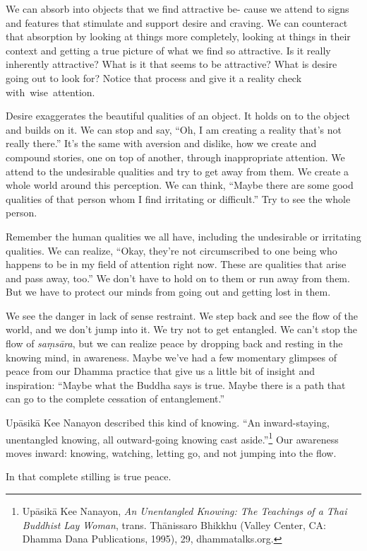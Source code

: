 We can absorb into objects that we find attractive be- \linebreak cause we attend to signs and features that stimulate and support desire and craving. We can counteract that absorption by looking at things more completely, looking at things in their context and getting a true picture of what we find so attractive. Is it really inherently attractive? What is it that seems to be attractive? What is desire going out to look for? Notice that process and give it a reality check \mbox{with wise attention.}

Desire exaggerates the beautiful qualities of an object. It holds on to the object and builds on it. We can stop and say, ``Oh, I am creating a reality that's not really there.'' It's the same with aversion and dislike, how we create and compound stories, one on top of another, through inappropriate attention. We attend to the undesirable qualities and try to get away from them. We create a whole world around this perception. We can think, ``Maybe there are some good qualities of that person whom I find irritating or difficult.'' Try to see the whole person.

Remember the human qualities we all have, including the undesirable or irritating qualities. We can realize, ``Okay, they're not circumscribed to one being who happens to be in my field of attention right now. These are qualities that arise and pass away, too.'' We don't have to hold on to them or run away from them. But we have to protect our minds from going out and getting lost in them.

We see the danger in lack of sense restraint. We step back and see the flow of the world, and we don't jump into it. We try not to get entangled. We can't stop the flow of \emph{saṃsāra}, but we can realize peace by dropping back and resting in the knowing mind, in awareness. Maybe we've had a few momentary glimpses of peace from our Dhamma practice that give us a little bit of insight and inspiration: ``Maybe what the Buddha says is true. Maybe there is a path that can go to the complete cessation of entanglement.''

Upāsikā Kee Nanayon described this kind of knowing. ``An inward-staying, unentangled knowing, all outward-going knowing cast aside.''\footnote{Upāsikā Kee Nanayon, \emph{An Unentangled Knowing: The Teachings of a Thai Buddhist Lay Woman}, trans. Thānissaro Bhikkhu (Valley Center, CA: Dhamma Dana Publications, 1995), 29, dhammatalks.org.} Our awareness moves inward: knowing, watching, letting go, and not jumping into the flow.

In that complete stilling is true peace.
